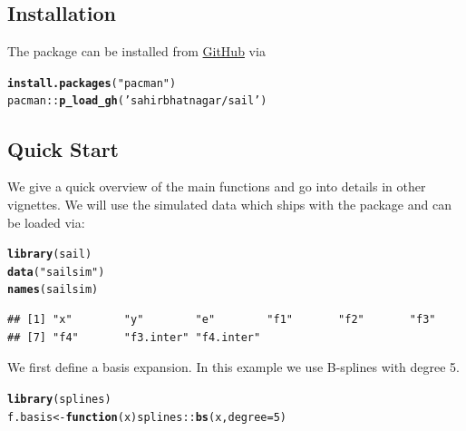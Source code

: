\documentclass[12pt,letter]{article}\usepackage[]{graphicx}\usepackage[]{color}
\makeatletter
\newcommand{\hlnum}[1]{\textcolor[rgb]{0.686,0.059,0.569}{#1}}%
\newcommand{\hlstr}[1]{\textcolor[rgb]{0.192,0.494,0.8}{#1}}%
\newcommand{\hlopt}[1]{\textcolor[rgb]{0,0,0}{#1}}%
\newcommand{\hlstd}[1]{\textcolor[rgb]{0.345,0.345,0.345}{#1}}%
\newcommand{\hlkwa}[1]{\textcolor[rgb]{0.161,0.373,0.58}{\textbf{#1}}}%
\newcommand{\hlkwb}[1]{\textcolor[rgb]{0.69,0.353,0.396}{#1}}%
\newcommand{\hlkwc}[1]{\textcolor[rgb]{0.333,0.667,0.333}{#1}}%
\newcommand{\hlkwd}[1]{\textcolor[rgb]{0.737,0.353,0.396}{\textbf{#1}}}%
\newenvironment{kframe}{%
 \def\at@end@of@kframe{}%
 \ifinner\ifhmode%
  \def\at@end@of@kframe{\end{minipage}}%
  \begin{minipage}{\columnwidth}%
 \fi\fi%
 \def\FrameCommand##1{\hskip\@totalleftmargin \hskip-\fboxsep
 \colorbox{shadecolor}{##1}\hskip-\fboxsep
     \hskip-\linewidth \hskip-\@totalleftmargin \hskip\columnwidth}%
 \MakeFramed {\advance\hsize-\width
   \@totalleftmargin\z@ \linewidth\hsize
   \@setminipage}}%
 {\par\unskip\endMakeFramed%
 \at@end@of@kframe}
\newenvironment{knitrout}{}{} %
\makeatother
\begin{document}
\subsection{Installation}

The package can be installed from \href{https://github.com/sahirbhatnagar/sail}{GitHub} via


\begin{knitrout}\scriptsize
{}\color{fgcolor}\begin{kframe}
\begin{alltt}
\hlkwd{install.packages}\hlstd{(}\hlstr{"pacman"}\hlstd{)}
\hlstd{pacman}\hlopt{::}\hlkwd{p_load_gh}\hlstd{(}\hlstr{'sahirbhatnagar/sail'}\hlstd{)}
\end{alltt}
\end{kframe}
\end{knitrout}



\subsection{Quick Start}

We give a quick overview of the main functions and go into details in other vignettes. We will use the simulated data which ships with the package and can be loaded via:

\begin{knitrout}\scriptsize
{}\color{fgcolor}\begin{kframe}
\begin{alltt}
\hlkwd{library}\hlstd{(sail)}
\hlkwd{data}\hlstd{(}\hlstr{"sailsim"}\hlstd{)}
\hlkwd{names}\hlstd{(sailsim)}
\end{alltt}
\begin{verbatim}
## [1] "x"        "y"        "e"        "f1"       "f2"       "f3"      
## [7] "f4"       "f3.inter" "f4.inter"
\end{verbatim}
\end{kframe}
\end{knitrout}

We first define a basis expansion. In this example we use B-splines with degree 5.

\begin{knitrout}\scriptsize
{}\color{fgcolor}\begin{kframe}
\begin{alltt}
\hlkwd{library}\hlstd{(splines)}
\hlstd{f.basis} \hlkwb{<-} \hlkwa{function}\hlstd{(}\hlkwc{x}\hlstd{) splines}\hlopt{::}\hlkwd{bs}\hlstd{(x,} \hlkwc{degree} \hlstd{=} \hlnum{5}\hlstd{)}
\end{alltt}
\end{kframe}
\end{knitrout}
\end{document}
